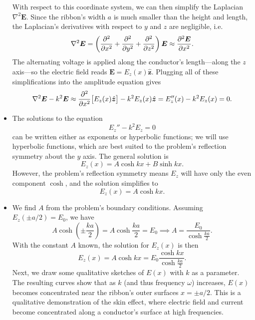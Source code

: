 \documentclass[11pt, a4paper]{article}
\renewcommand{\vec}[1]{\bm{#1}} %
\newcommand{\uvec}[1]{\hat{\vec{#1}}} %
\newcommand{\E}{\vec{E}}  %
\renewcommand{\laplacian}{\nabla^{2}}
\begin{document}
\begin{itemize}
	With respect to this coordinate system, we can then simplify the Laplacian $ \laplacian \E $. Since the ribbon's width $ a $ is much smaller than the height and length, the Laplacian's derivatives with respect to $ y $ and $ z $ are negligible, i.e.
	\begin{equation*}
		\laplacian \E = \left(\pdv[2]{}{x} + \pdv[2]{}{y} + \pdv[2]{}{z}\right)\E \approx \pdv[2]{\E}{x}.
	\end{equation*}
	The alternating voltage is applied along the conductor's length---along the $ z $ axis---so the electric field reads $ \E = E_{z}(x) \uvec{z} $. Plugging all of these simplifications into the amplitude equation gives
	\begin{equation*}
		\laplacian \E - k^{2}\E \approx \pdv[2]{}{x} \big[E_{z}(x) \uvec{z}\big] - k^{2}E_{z}(x) \uvec{z} =   E_{z}''(x) - k^{2}E_{z}(x) = 0.
	\end{equation*}
	\item The solutions to the equation 
	\begin{equation*}
		E_{z}'' - k^{2}E_{z} = 0
	\end{equation*}
	can be written either as exponents or hyperbolic functions; we will use hyperbolic functions, which are best suited to the problem's reflection symmetry about the $ y $ axis. The general solution is
	\begin{equation*}
		E_{z}(x) = A\cosh kx + B\sinh kx.
	\end{equation*}
	However, the problem's reflection symmetry means $ E_{z} $ will have only the even component $ \cosh $, and the solution simplifies to
	\begin{equation*}
		E_{z}(x) = A\cosh kx.
	\end{equation*}
	
	\item We find $ A $ from the problem's boundary conditions. Assuming $ E_{z}(\pm a/2) = E_{0} $, we have
	\begin{equation*}
		A \cosh \left(\pm \frac{ka}{2}\right) = A \cosh \frac{ka}{2} = E_{0} \implies A = \frac{E_{0}}{\cosh \frac{ka}{2}}.
	\end{equation*} 
	With the constant $ A $ known, the solution for $ E_{z}(x) $ is then
	\begin{equation*}
		E_{z}(x) = A\cosh kx = E_{0}\frac{\cosh kx}{\cosh \frac{ka}{2}}.
	\end{equation*}
	Next, we draw some qualitative sketches of $ E(x) $ with $ k $ as a parameter. The resulting curves show that as $ k $ (and thus frequency $ \omega $) increases, $ E(x) $ becomes concentrated near the ribbon's outer surfaces  $ x = \pm a/2 $. This is a qualitative demonstration of the skin effect, where electric field and current become concentrated along a conductor's surface at high frequencies.
\end{itemize}	
	
\end{document}
